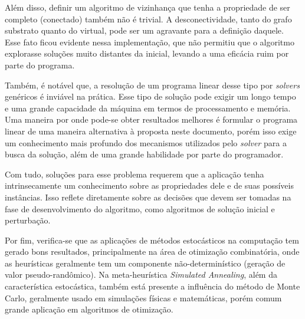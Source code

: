 \documentclass{article}
\begin{document}
Além disso, definir um algoritmo de vizinhança que tenha a propriedade de ser completo (conectado) também não é trivial. A desconectividade, tanto do grafo substrato quanto do virtual, pode ser um agravante para a definição daquele. Esse fato ficou evidente nessa implementação, que não permitiu que o algoritmo explorasse soluções muito distantes da inicial, levando a uma eficácia ruim por parte do programa.

Também, é notável que, a resolução de um programa linear desse tipo por \emph{solvers} genéricos é inviável na prática. Esse tipo de solução pode exigir um longo tempo e uma grande capacidade da máquina em termos de processamento e memória. Uma maneira por onde pode-se obter resultados melhores é formular o programa linear de uma maneira alternativa à proposta neste documento, porém isso exige um conhecimento mais profundo dos mecanismos utilizados pelo \emph{solver} para a busca da solução, além de uma grande habilidade por parte do programador.

Com tudo, soluções para esse problema requerem que a aplicação tenha intrinsecamente um conhecimento sobre as propriedades dele e de suas possíveis instâncias. Isso reflete diretamente sobre as decisões que devem ser tomadas na fase de desenvolvimento do algoritmo, como algoritmos de solução inicial e perturbação.

Por fim, verifica-se que as aplicações de métodos estocásticos na computação tem gerado bons resultados, principalmente na área de otimização combinatória, onde as heurísticas geralmente tem um componente não-determinístico (geração de valor pseudo-randômico). Na meta-heurística \emph{Simulated Annealing}, além da característica estocástica, também está presente a influência do método de Monte Carlo, geralmente usado em simulações físicas e matemáticas, porém comum grande aplicação em algoritmos de otimização.
\end{document}
